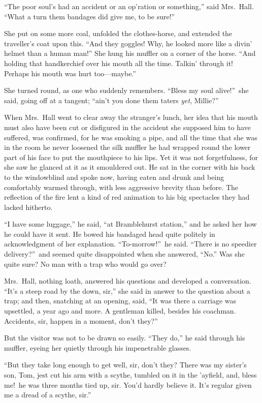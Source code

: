 “The poor soul’s had an accident or an op’ration or something,” said Mrs.\ Hall. “What a turn them bandages did give me, to be sure!”

She put on some more coal, unfolded the clothes-horse, and extended the traveller’s coat upon this. “And they goggles! Why, he looked more like a divin’ helmet than a human man!” She hung his muffler on a corner of the horse. “And holding that handkerchief over his mouth all the time. Talkin’ through it! Perhaps his mouth was hurt too—maybe.”

She turned round, as one who suddenly remembers. “Bless my soul alive!”\ she said, going off at a tangent; “ain’t you done them taters \emph{yet}, Millie?”

When Mrs.\ Hall went to clear away the stranger’s lunch, her idea that his mouth must also have been cut or disfigured in the accident she supposed him to have suffered, was confirmed, for he was smoking a pipe, and all the time that she was in the room he never loosened the silk muffler he had wrapped round the lower part of his face to put the mouthpiece to his lips. Yet it was not forgetfulness, for she saw he glanced at it as it smouldered out. He sat in the corner with his back to the windowblind and spoke now, having eaten and drunk and being comfortably warmed through, with less aggressive brevity than before. The reflection of the fire lent a kind of red animation to his big spectacles they had lacked hitherto.

“I have some luggage,” he said, “at Bramblehurst station,” and he asked her how he could have it sent. He bowed his bandaged head quite politely in acknowledgment of her explanation. “To-morrow!”\ he said. “There is no speedier delivery?”\ and seemed quite disappointed when she answered, “No.” Was she quite sure? No man with a trap who would go over?

Mrs.\ Hall, nothing loath, answered his questions and developed a conversation. “It’s a steep road by the down, sir,” she said in answer to the question about a trap; and then, snatching at an opening, said, “It was there a carriage was upsettled, a year ago and more. A gentleman killed, besides his coachman. Accidents, sir, happen in a moment, don’t they?”

But the visitor was not to be drawn so easily. “They do,” he said through his muffler, eyeing her quietly through his impenetrable glasses.

“But they take long enough to get well, sir, don’t they? There was my sister’s son, Tom, jest cut his arm with a scythe, tumbled on it in the ’ayfield, and, bless me!\ he was three months tied up, sir. You’d hardly believe it. It’s regular given me a dread of a scythe, sir.”

